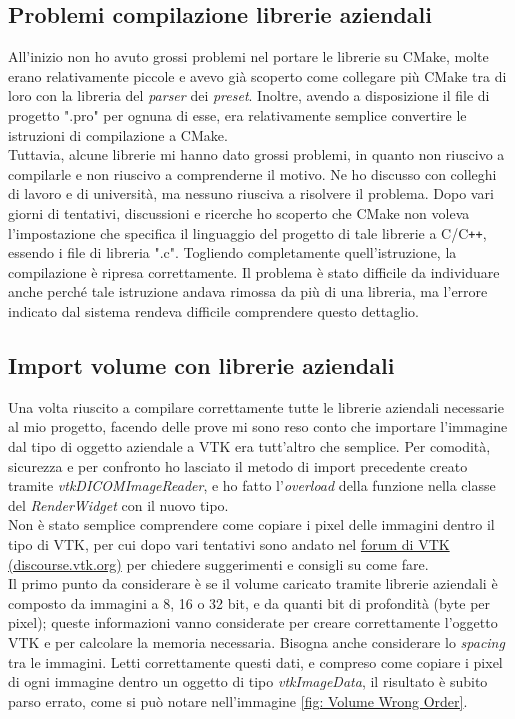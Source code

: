 \subsection{Problemi compilazione librerie aziendali}
All'inizio non ho avuto grossi problemi nel portare le librerie su CMake, molte erano relativamente piccole e avevo già scoperto come collegare più CMake tra di loro con la libreria del \emph{parser} dei \emph{preset}. Inoltre, avendo a disposizione il file di progetto ".pro" per ognuna di esse, era relativamente semplice convertire le istruzioni di compilazione a CMake. 
\\
Tuttavia, alcune librerie mi hanno dato grossi problemi, in quanto non riuscivo a compilarle e non riuscivo a comprenderne il motivo. Ne ho discusso con colleghi di lavoro e di università, ma nessuno riusciva a risolvere il problema. Dopo vari giorni di tentativi, discussioni e ricerche ho scoperto che CMake non voleva l'impostazione che specifica il linguaggio del progetto di tale librerie a C/C\texttt{++}, essendo i file di libreria ".c". Togliendo completamente quell'istruzione, la compilazione è ripresa correttamente. Il problema è stato difficile da individuare anche perché tale istruzione andava rimossa da più di una libreria, ma l'errore indicato dal sistema rendeva difficile comprendere questo dettaglio.

\subsection{Import volume con librerie aziendali}
Una volta riuscito a compilare correttamente tutte le librerie aziendali necessarie al mio progetto, facendo delle prove mi sono reso conto che importare l'immagine dal tipo di oggetto aziendale a VTK era tutt'altro che semplice. Per comodità, sicurezza e per confronto ho lasciato il metodo di import precedente creato tramite \emph{vtkDICOMImageReader}, e ho fatto l'\emph{overload} della funzione nella classe del \emph{RenderWidget} con il nuovo tipo.
\\
Non è stato semplice comprendere come copiare i pixel delle immagini dentro il tipo di VTK, per cui dopo vari tentativi sono andato nel \href{https://discourse.vtk.org/t/trying-to-load-custom-loaded-images-into-vtkimageimport/3704}{forum di VTK (discourse.vtk.org)} per chiedere suggerimenti e consigli su come fare.
\\
Il primo punto da considerare è se il volume caricato tramite librerie aziendali è composto da immagini a 8, 16 o 32 bit, e da quanti bit di profondità (byte per pixel); queste informazioni vanno considerate per creare correttamente l'oggetto VTK e per calcolare la memoria necessaria. Bisogna anche considerare lo \emph{spacing} tra le immagini. Letti correttamente questi dati, e compreso come copiare i pixel di ogni immagine dentro un oggetto di tipo \emph{vtkImageData}, il risultato è subito parso errato, come si può notare nell'immagine \ref{fig: Volume Wrong Order}.

